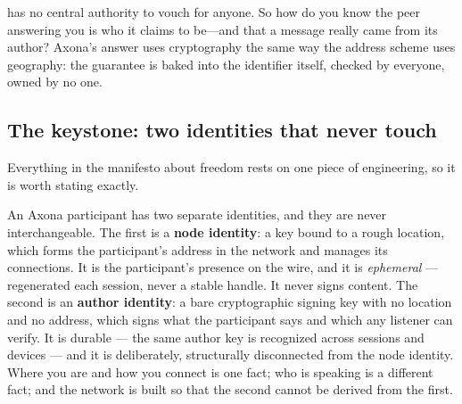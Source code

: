 \documentclass[nobib,justified]{tufte-handout}
\begin{document}
 has no central authority to vouch for anyone. So how do you know the peer answering you is who it claims to be---and that a message really came from its author? Axona's answer uses cryptography the same way the address scheme uses geography: the guarantee is baked into the identifier itself, checked by everyone, owned by no one.

\subsection{The keystone: two identities that never touch}

Everything in the manifesto about freedom rests on one piece of engineering, so
it is worth stating exactly.

An Axona participant has two separate identities, and they are never
interchangeable. The first is a \textbf{node identity}: a key bound to a rough
location, which forms the participant's address in the network and manages its
connections. It is the participant's presence on the wire, and it is
\emph{ephemeral} --- regenerated each session, never a stable handle. It never
signs content. The second is an \textbf{author identity}: a bare cryptographic
signing key with no location and no address, which signs what the participant
says and which any listener can verify. It is durable --- the same author key
is recognized across sessions and devices --- and it is deliberately,
structurally disconnected from the node identity. Where you are and how you
connect is one fact; who is speaking is a different fact; and the network is
built so that the second cannot be derived from the first.
\end{document}
